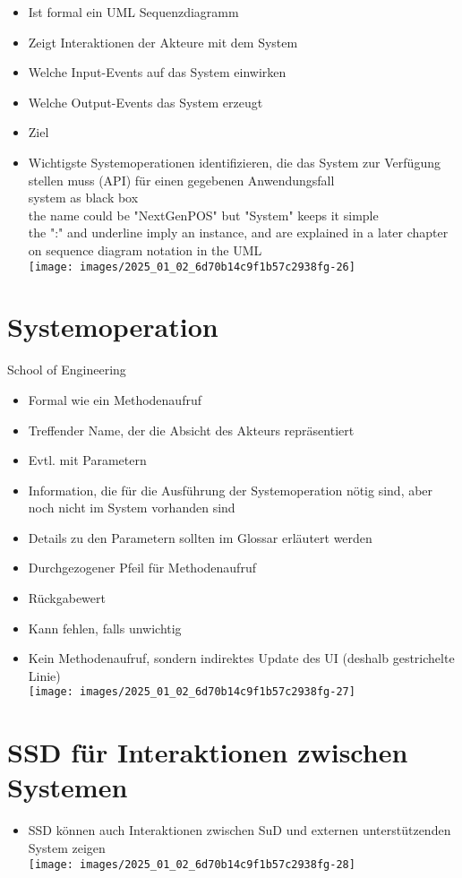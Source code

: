 \documentclass[10pt]{article}
\begin{document}
\begin{itemize}
  \item Ist formal ein UML Sequenzdiagramm
  \item Zeigt Interaktionen der Akteure mit dem System
  \item Welche Input-Events auf das System einwirken
  \item Welche Output-Events das System erzeugt
  \item Ziel
  \item Wichtigste Systemoperationen identifizieren, die das System zur Verfügung stellen muss (API) für einen gegebenen Anwendungsfall\\
system as black box\\
the name could be "NextGenPOS" but "System" keeps it simple\\
the ":" and underline imply an instance, and are explained in a later chapter on sequence diagram notation in the UML\\
\texttt{[image: images/2025\_01\_02\_6d70b14c9f1b57c2938fg-26]}
\end{itemize}

\section*{Systemoperation}
School of Engineering

\begin{itemize}
  \item Formal wie ein Methodenaufruf
  \item Treffender Name, der die Absicht des Akteurs repräsentiert
  \item Evtl. mit Parametern
  \item Information, die für die Ausführung der Systemoperation nötig sind, aber noch nicht im System vorhanden sind
  \item Details zu den Parametern sollten im Glossar erläutert werden
  \item Durchgezogener Pfeil für Methodenaufruf
  \item Rückgabewert
  \item Kann fehlen, falls unwichtig
  \item Kein Methodenaufruf, sondern indirektes Update des UI (deshalb gestrichelte Linie)\\
\texttt{[image: images/2025\_01\_02\_6d70b14c9f1b57c2938fg-27]}
\end{itemize}

\section*{SSD für Interaktionen zwischen Systemen}
\begin{itemize}
  \item SSD können auch Interaktionen zwischen SuD und externen unterstützenden System zeigen\\
\texttt{[image: images/2025\_01\_02\_6d70b14c9f1b57c2938fg-28]}
\end{itemize}
\end{document}
